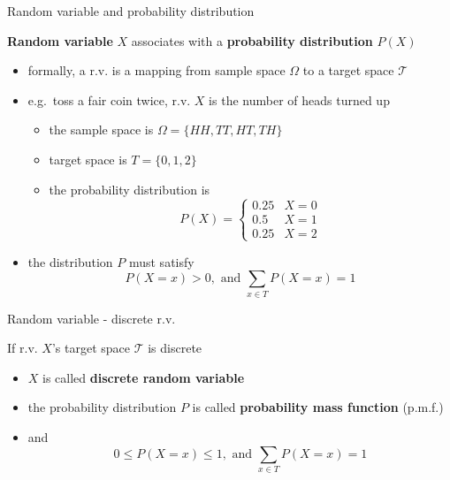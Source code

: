 \documentclass[ignorenonframetext,]{beamer}
\providecommand{\tightlist}{%
  \setlength{\itemsep}{0pt}\setlength{\parskip}{0pt}}
\begin{document}
\begin{frame}{Random variable and probability distribution}
\protect\hypertarget{random-variable-and-probability-distribution}{}

\textbf{Random variable} \(X\) associates with a \textbf{probability
distribution} \(P(X)\)

\begin{itemize}
\tightlist
\item
  formally, a r.v. is a mapping from sample space \(\Omega\) to a target
  space \(\mathcal{T}\)
\item
  e.g.~toss a fair coin twice, r.v. \(X\) is the number of heads turned
  up

  \begin{itemize}
  \tightlist
  \item
    the sample space is \(\Omega =\{HH, TT, HT, TH\}\)
  \item
    target space is \(T =\{0,1,2\}\)
  \item
    the probability distribution is \[P(X) = \begin{cases} 0.25 & X=0 \\
    0.5 & X=1 \\
    0.25 & X=2 \end{cases}\]
  \end{itemize}
\item
  the distribution \(P\) must satisfy
  \[P(X=x) >0, \text{ and } \sum_{x\in T} P(X=x) =1\]
\end{itemize}

\end{frame}

\begin{frame}{Random variable - discrete r.v.}
\protect\hypertarget{random-variable---discrete-r.v.}{}

If r.v. \(X\)'s target space \(\mathcal{T}\) is discrete

\begin{itemize}
\tightlist
\item
  \(X\) is called \textbf{discrete random variable}
\item
  the probability distribution \(P\) is called \textbf{probability mass
  function} (p.m.f.)
\item
  and \[0\leq P(X=x) \leq 1, \text{ and } \sum_{x\in T} P(X=x) =1\]
\end{itemize}

\end{frame}
\end{document}
